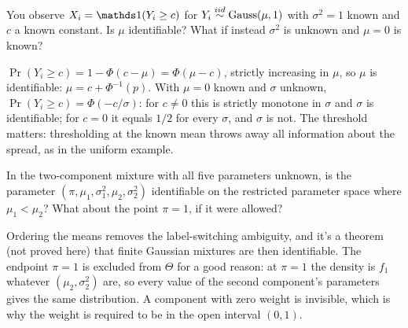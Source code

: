 \begin{exercise}
You observe $X_i = \ind(Y_i \geq c)$ for $Y_i \stackrel{iid}{\sim} \text{Gauss}(\mu, 1)$ with $\sigma^2 = 1$ known and $c$ a known constant. Is $\mu$ identifiable? What if instead $\sigma^2$ is unknown and $\mu = 0$ is known?
\end{exercise}
\begin{solution}
$\Pr(Y_i \geq c) = 1 - \Phi(c - \mu) = \Phi(\mu - c)$, strictly increasing in $\mu$, so $\mu$ is identifiable: $\mu = c + \Phi^{-1}(p)$. With $\mu = 0$ known and $\sigma$ unknown, $\Pr(Y_i \geq c) = \Phi(-c/\sigma)$: for $c \neq 0$ this is strictly monotone in $\sigma$ and $\sigma$ is identifiable; for $c = 0$ it equals $1/2$ for every $\sigma$, and $\sigma$ is not. The threshold matters: thresholding at the known mean throws away all information about the spread, as in the uniform example.
\end{solution}

\begin{exercise}
In the two-component mixture with all five parameters unknown, is the parameter $(\pi, \mu_1, \sigma_1^2, \mu_2, \sigma_2^2)$ identifiable on the restricted parameter space where $\mu_1 < \mu_2$? What about the point $\pi = 1$, if it were allowed?
\end{exercise}
\begin{solution}
Ordering the means removes the label-switching ambiguity, and it's a theorem (not proved here) that finite Gaussian mixtures are then identifiable. The endpoint $\pi = 1$ is excluded from $\Theta$ for a good reason: at $\pi = 1$ the density is $f_1$ whatever $(\mu_2, \sigma_2^2)$ are, so every value of the second component's parameters gives the same distribution. A component with zero weight is invisible, which is why the weight is required to be in the open interval $(0, 1)$.
\end{solution}

